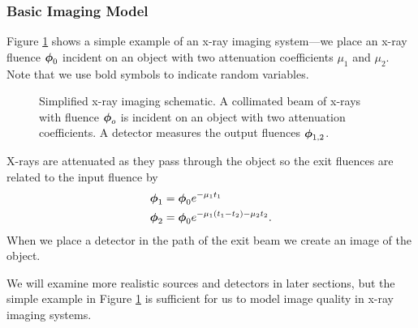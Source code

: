 \documentclass[mphy386-notes.tex]{subfiles}
\begin{document}
\subsubsection{Basic Imaging Model}
Figure \ref{fig:simple} shows a simple
example of an x-ray imaging system---we place an x-ray fluence $\boldsymbol{\phi}_0$
incident on an object with two attenuation coefficients $\mu_1$ and $\mu_2$. Note that we use bold symbols to indicate random variables.
\begin{figure}[h]
\begin{center}
\end{center}
\captionsetup{width=1.0\linewidth}
\caption{Simplified x-ray imaging schematic. A collimated beam of x-rays with
  fluence $\boldsymbol{\phi}_o$ is incident on an object with two attenuation
  coefficients. A detector measures the output fluences $\boldsymbol{\phi}_{1,2}$.}
\label{fig:simple}
\end{figure}
X-rays are attenuated as they pass through the object so the exit fluences are
related to the input fluence by
\begin{align}
  \boldsymbol{\phi}_1 &= \boldsymbol{\phi}_0e^{-\mu_1 t_1}\\
  \boldsymbol{\phi}_2 &= \boldsymbol{\phi}_0e^{-\mu_1(t_1 - t_2) - \mu_2t_2}. 
\end{align}
When we place a detector in the path of the exit beam we create an image of the
object. 

We will examine more realistic sources and detectors in later sections, but the
simple example in Figure \ref{fig:simple} is sufficient for us to model image
quality in x-ray imaging systems.
\end{document}
